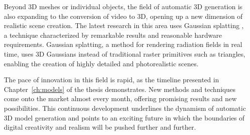 Beyond 3D meshes or individual objects, the field of automatic 3D generation is also expanding to the conversion of video to 3D, opening up a new dimension of realistic scene creation. The latest research in this area uses Gaussian splatting \citep{kerbl3Dgaussians}, a technique characterized by remarkable results and reasonable hardware requirements. Gaussian splatting, a method for rendering radiation fields in real time, uses 3D Gaussians instead of traditional raster primitives such as triangles, enabling the creation of highly detailed and photorealistic scenes.

The pace of innovation in this field is rapid, as the timeline presented in Chapter~\ref{ch:models} of the thesis demonstrates. New methods and techniques come onto the market almost every month, offering promising results and new possibilities. This continuous development underlines the dynamism of automatic 3D model generation and points to an exciting future in which the boundaries of digital creativity and realism will be pushed further and further.

